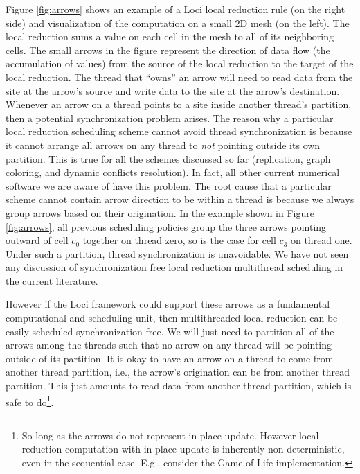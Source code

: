 \documentclass{article}
\begin{document}
Figure \ref{fig:arrows} shows an example of a Loci local reduction rule
(on the right side) and visualization of the computation on a small 2D
mesh (on the left).  The local reduction sums a value on each cell in
the mesh to all of its neighboring cells.  The small arrows in the
figure represent the direction of data flow (the accumulation of values)
from the source of the local reduction to the target of the local
reduction.  The thread that ``owns'' an arrow will need to read data
from the site at the arrow's source and write data to the site at the
arrow's destination.  Whenever an arrow on a thread points to a site
inside another thread's partition, then a potential synchronization
problem arises.  The reason why a particular local reduction scheduling
scheme cannot avoid thread synchronization is because it cannot arrange
all arrows on any thread to \emph{not} pointing outside its own
partition.  This is true for all the schemes discussed so far
(replication, graph coloring, and dynamic conflicts resolution).  In
fact, all other current numerical software we are aware of have this
problem.  The root cause that a particular scheme cannot contain arrow
direction to be within a thread is because we always group arrows based
on their origination.  In the example shown in Figure \ref{fig:arrows},
all previous scheduling policies group the three arrows pointing outward
of cell $c_0$ together on thread zero, so is the case for cell $c_3$ on
thread one.  Under such a partition, thread synchronization is
unavoidable.  We have not seen any discussion of synchronization free
local reduction multithread scheduling in the current literature.

However if the Loci framework could support these arrows as a
fundamental computational and scheduling unit, then multithreaded local
reduction can be easily scheduled synchronization free.  We will just
need to partition all of the arrows among the threads such that no arrow
on any thread will be pointing outside of its partition.  It is okay
to have an arrow on a thread to come from another thread partition, i.e.,
the arrow's origination can be from another thread partition.  This just
amounts to read data from another thread partition, which is safe to
do\footnote{So long as the arrows do not represent in-place update.
However local reduction computation with in-place update is inherently
non-deterministic, even in the sequential case.  E.g., consider the Game
of Life implementation.}.
\end{document}
